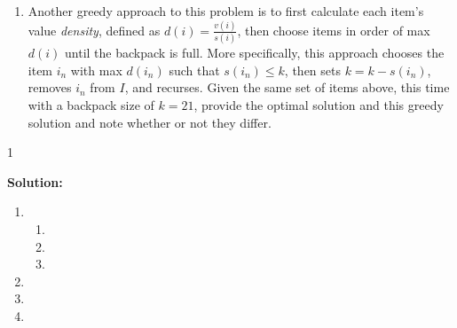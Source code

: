 \documentclass[9pt]{article}
\def\solutions{1}
\begin{document}
\begin{enumerate}
\item Another greedy approach to this problem is to first calculate each item's value \textit{density}, defined as $d(i) = \frac{v(i)}{s(i)}$, then choose items in order of max $d(i)$ until the backpack is full. More specifically, this approach chooses the item $i_n$ with max $d(i_n)$ such that $s(i_n) \leq k$, then sets $k = k - s(i_n)$, removes $i_n$ from $I$, and recurses. Given the same set of items above, this time with a backpack size of $k = 21$, provide the optimal solution and this greedy solution and note whether or not they differ.

\end{enumerate}

  \if\solutions1
  \vspace{2mm}
  
  \textbf{Solution:}   \\

\begin{enumerate}

\item 
\begin{enumerate}
    \item  
    \item 
    \item 
\end{enumerate}

\item

\item 

\item 

\end{enumerate}

\fi

\newpage



\vspace{5mm}
\end{document}
